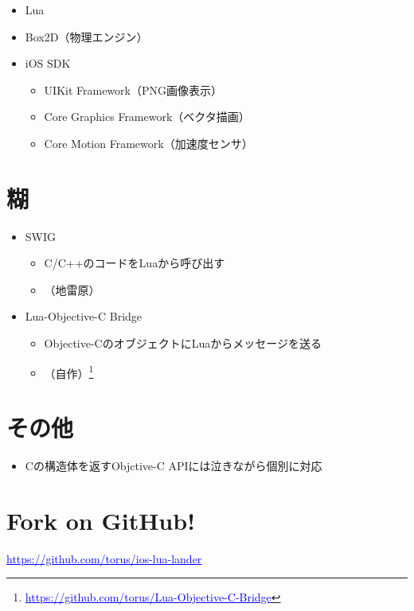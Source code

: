 \documentclass[slide,papersize]{jsarticle}
\newcommand{\link}[1]{\textcolor[named]{Blue}{\underline{#1}}}
\begin{document}
\begin{itemize}
 \item Lua
 \item Box2D（物理エンジン）
 \item iOS SDK
       \begin{itemize}
        \item UIKit Framework（PNG画像表示）
        \item Core Graphics Framework（ベクタ描画）
        \item Core Motion Framework（加速度センサ）
       \end{itemize}
\end{itemize}


\section*{糊}

\begin{itemize}
 \item SWIG
       \begin{itemize}
        \item C/C++のコードをLuaから呼び出す
        \item （地雷原）
       \end{itemize}

 \item Lua-Objective-C Bridge
       \begin{itemize}
        \item Objective-CのオブジェクトにLuaからメッセージを送る
        \item （自作）\footnote{\link{https://github.com/torus/Lua-Objective-C-Bridge}}
       \end{itemize}
\end{itemize}

\section*{その他}

\begin{itemize}
  \item Cの構造体を返すObjctive-C APIには泣きながら個別に対応
\end{itemize}

\section*{Fork on GitHub!}


\vspace*{1cm}

\begin{center}
\link{https://github.com/torus/ios-lua-lander}
\end{center}
\end{document}
